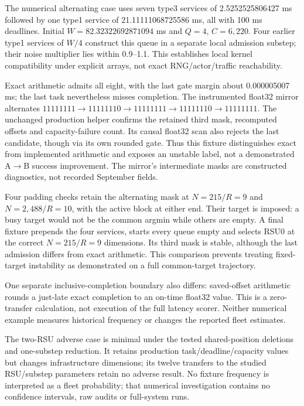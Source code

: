 \documentclass[11pt,a4paper]{article}
\begin{document}
The numerical alternating case uses seven type3 services of 2.5252525806427 ms followed by one type1 service of 21.11111068725586 ms, all with 100 ms deadlines. Initial $W=82.32322692871094$ ms and $Q=4$, $C=6{,}220$. Four earlier type1 services of $W/4$ construct this queue in a separate local admission substep; their noise multiplier lies within 0.9--1.1. This establishes local kernel compatibility under explicit arrays, not exact RNG/actor/traffic reachability.

Exact arithmetic admits all eight, with the last gate margin about 0.000005007 ms; the last task nevertheless misses completion. The instrumented float32 mirror alternates $11111111\to11111110\to11111111\to11111110\to11111111$. The unchanged production helper confirms the retained third mask, recomputed offsets and capacity-failure count. Its causal float32 scan also rejects the last candidate, though via its own rounded gate. Thus this fixture distinguishes exact from implemented arithmetic and exposes an unstable label, not a demonstrated A\ensuremath{\to}B success improvement. The mirror's intermediate masks are constructed diagnostics, not recorded September fields.

Four padding checks retain the alternating mask at $N=215/R=9$ and $N=2{,}488/R=10$, with the active block at either end. Their target is imposed: a busy target would not be the common argmin while others are empty. A final fixture prepends the four services, starts every queue empty and selects RSU0 at the correct $N=215/R=9$ dimensions. Its third mask is stable, although the last admission differs from exact arithmetic. This comparison prevents treating fixed-target instability as demonstrated on a full common-target trajectory.

One separate inclusive-completion boundary also differs: saved-offset arithmetic rounds a just-late exact completion to an on-time float32 value. This is a zero-transfer calculation, not execution of the full latency scorer. Neither numerical example measures historical frequency or changes the reported fleet estimates.

The two-RSU adverse case is minimal under the tested shared-position deletions and one-substep reduction. It retains production task/deadline/capacity values but changes infrastructure dimensions; its twelve transfers to the studied RSU/substep parameters retain no adverse result. No fixture frequency is interpreted as a fleet probability; that numerical investigation contains no confidence intervals, raw audits or full-system runs.
\end{document}
